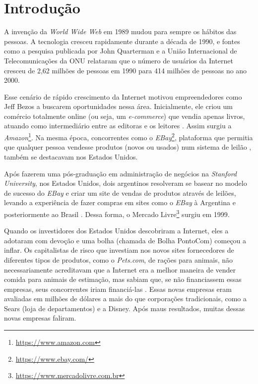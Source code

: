 \chapter[Introdução]{Introdução}
A invenção da \textit{World Wide Web} em 1989 mudou para sempre os hábitos das pessoas. A tecnologia cresceu rapidamente durante a década de 1990, e fontes como a pesquisa publicada por John Quarterman \cite{quarterman} e a União Internacional de Telecomunicações da ONU \cite{onu} relataram que o número de usuários da Internet cresceu de 2,62 milhões de pessoas em 1990 para 414 milhões de pessoas no ano 2000.

Esse cenário de rápido crescimento da Internet motivou empreendedores como Jeff Bezos a buscarem oportunidades nessa área. Inicialmente, ele criou um comércio totalmente online (ou seja, um \textit{e-commerce}) que vendia apenas livros, atuando como intermediário entre as editoras e os leitores \cite{loja_de_tudo}. Assim surgiu a \textit{Amazon}\footnote{\url{https://www.amazon.com}}. Na mesma época, concorrentes como o \textit{EBay}\footnote{\url{https://www.ebay.com/}}, plataforma que permitia que qualquer pessoa vendesse produtos (novos ou usados) num sistema de leilão \cite{manual_usuario}, também se destacavam nos Estados Unidos.

Após fazerem uma pós-graduação em administração de negócios na \textit{Stanford University}, nos Estados Unidos, dois argentinos resolveram se basear no modelo de sucesso do \textit{EBay} e criar um site de vendas de produtos através de leilões, levando a experiência de fazer compras em sites como o \textit{EBay} à Argentina e posteriormente ao Brasil \cite{manual_usuario}. Dessa forma, o Mercado Livre\footnote{\url{https://www.mercadolivre.com.br}} surgiu em 1999.

Quando os investidores dos Estados Unidos descobriram a Internet, eles a adotaram com devoção e uma bolha (chamada de Bolha PontoCom) começou a inflar. Os capitalistas de risco que investiam nos novos sites fornecedores de diferentes tipos de produtos, como o \textit{Pets.com}, de rações para animais, não necessariamente acreditavam que a Internet era a melhor maneira de vender comida para animais de estimação, mas sabiam que, se não financiassem essas empresas, seus concorrentes iriam financiá-las \cite{dot.con}. Essas novas empresas eram avaliadas em milhões de dólares a mais do que corporações tradicionais, como a Sears (loja de departamentos) e a Disney. Após maus resultados, muitas dessas novas empresas faliram.


